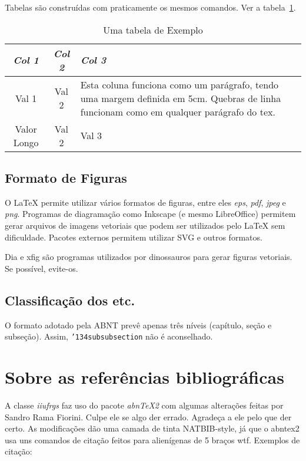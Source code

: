 Tabelas são construídas com praticamente os mesmos comandos.
Ver a tabela~\ref{tab:ex1}.

\begin{table}[h]
    \caption{Uma tabela de Exemplo}
    \begin{center}
        \begin{tabular}{c|c|p{5cm}}
            \textit{Col 1} & \textit{Col 2} & \textit{Col 3} \\
            \hline
            \hline
            Val 1 & Val 2 & Esta coluna funciona como um parágrafo, tendo uma margem definida em 5cm.
            Quebras de linha funcionam como em qualquer parágrafo do tex. \\
            Valor Longo    & Val 2          & Val 3          \\
            \hline
        \end{tabular}
    \end{center}
    \label{tab:ex1}
\end{table}

\subsection{Formato de Figuras}
\label{subsec:fig_format}

O LaTeX permite utilizar vários formatos de figuras, entre eles \emph{eps}, \emph{pdf}, \emph{jpeg} e \emph{png}.
Programas de diagramação como Inkscape (e mesmo LibreOffice) permitem gerar arquivos de imagens vetoriais que podem ser utilizados pelo LaTeX sem dificuldade.
Pacotes externos permitem utilizar SVG e outros formatos.

Dia e xfig são programas utilizados por dinossauros para gerar figuras vetoriais.
Se possível, evite-os.

\subsection{Classificação dos etc.}

O formato adotado pela ABNT prevê apenas três níveis (capítulo, seção e subseção).
Assim, \texttt{\char'134subsubsection} não é aconselhado.


\section{Sobre as referências bibliográficas}

A classe \emph{iiufrgs} faz uso do pacote \emph{abnTeX2} com algumas alterações
feitas por Sandro Rama Fiorini.
Culpe ele se algo der errado.
Agradeça a ele
pelo que der certo.
As modificações dão uma camada de tinta NATBIB-style,
já que o abntex2 usa uns comandos de citação feitos para alienígenas de 5 braços
wtf.
Exemplos de citação:

